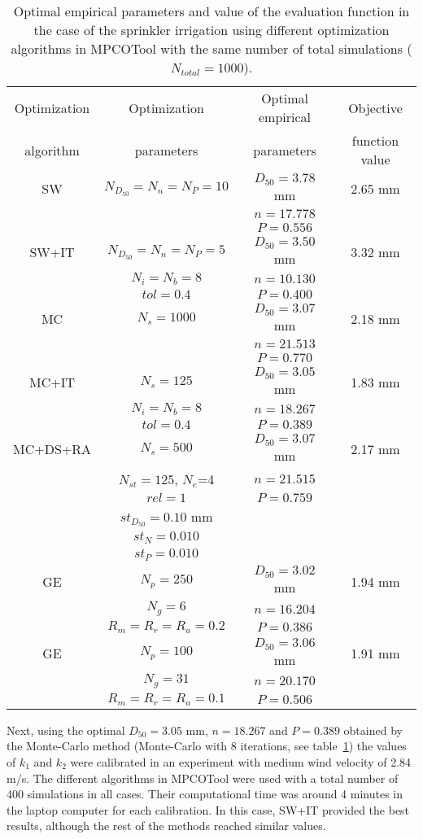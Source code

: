 \documentclass[review,authoryear]{elsarticle}
\newcommand{\TABLE}[5]
{
	\begin{table}[ht!]
		\centering
		\caption{#4.\label{#5}}
		#1
		\begin{tabular}{#2}
			#3
		\end{tabular}
	\end{table}
}
\begin{document}
\TABLE{\scriptsize}{cccc}
{
	Optimization & Optimization & Optimal empirical & Objective
	\\ algorithm & parameters & parameters & function value
	\\ \hline
	SW & $N_{D_{50}}=N_n=N_P=10$ & $D_{50}=3.78$ mm & 2.65 mm
	\\ & & $n=17.778$
	\\ & & $P=0.556$
	\\ \hline
	SW+IT & $N_{D_{50}}=N_n=N_P=5$ & $D_{50}=3.50$ mm & 3.32 mm
	\\ & $N_i=N_b=8$ & $n=10.130$
	\\ & $tol=0.4$ & $P=0.400$
	\\ \hline
	MC & $N_s=1000$ & $D_{50}=3.07$ mm & 2.18 mm
	\\ & & $n=21.513$
	\\ & & $P=0.770$
	\\ \hline
	MC+IT & $N_s=125$ & $D_{50}=3.05$ mm & 1.83 mm
	\\ & $N_i=N_b=8$ & $n=18.267$
	\\ & $tol=0.4$ & $P=0.389$
	\\ \hline
	MC+DS+RA & $N_s=500$ & $D_{50}=3.07$ mm & 2.17 mm
	\\ & $N_{st}=125$, $N_e$=4 & $n=21.515$
	\\ & $rel=1$ & $P=0.759$
	\\ & $st_{D_{50}}=0.10$ mm
	\\ & $st_N=0.010$
	\\ & $st_P=0.010$
	\\ \hline
	GE & $N_p=250$ & $D_{50}=3.02$ mm & 1.94 mm
	\\ & $N_g=6$ & $n=16.204$
	\\ & $R_m=R_r=R_a=0.2$ & $P=0.386$
	\\ \hline
	GE & $N_p=100$ & $D_{50}=3.06$ mm & 1.91 mm
	\\ & $N_g=31$ & $n=20.170$
	\\ & $R_m=R_r=R_a=0.1$ & $P=0.506$
	\\ \hline
}{Optimal empirical parameters and value of the evaluation function in the case of the sprinkler irrigation
using different optimization algorithms in MPCOTool with the same number of total simulations ($N_{total}=1000$)}{TabSprinklerI}

Next, using the optimal $D_{50}=3.05$ mm, $n=18.267$ and $P=0.389$ obtained by the Monte-Carlo method (Monte-Carlo with 8 iterations, see table~\ref{TabSprinklerI}) the values of $k_1$ and $k_2$ were calibrated in an experiment with medium wind velocity of 2.84 m/s. The different algorithms in MPCOTool were used with a total number of 400 simulations in all cases. Their computational time was around 4 minutes in the laptop computer for each calibration. In this case, SW+IT provided the best results, although the rest of the methods reached similar values.
\end{document}
